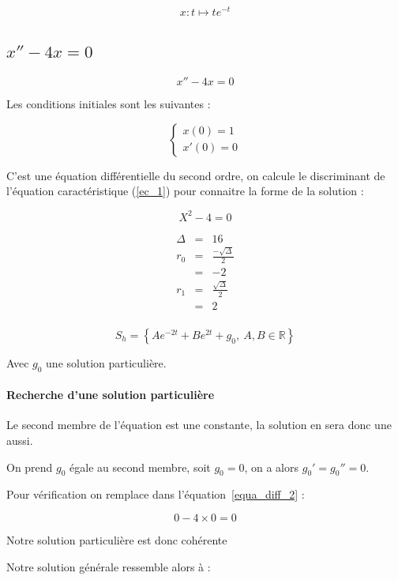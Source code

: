 \documentclass[a4paper, 11pt]{report} %
\newcommand{\R}{\mathbb{R}}
\renewcommand{\mapsto}{\longmapsto}
\begin{document}
\[
x : t \mapsto te^{-t}
\]
\subsection{$x'' - 4x = 0$} %

\begin{equation}
x'' - 4x = 0
\label{equa_diff_2}
\end{equation}

Les conditions initiales sont les suivantes :

\[
\left\{\begin{array}{l}
x(0) = 1\\
x'(0) = 0
\end{array}\right.
\]

C'est une équation différentielle du second ordre, on calcule le discriminant de l'équation caractéristique (\ref{ec_1})
pour connaitre la forme de la solution :

\begin{equation}
X^2 - 4 = 0
\label{ec_1}
\end{equation}

\begin{eqnarray*}
    \Delta & = & 16\\
    r_0 & = & \frac{-\sqrt{\Delta}}{2}\\
    & = & -2\\
    r_1 & = & \frac{\sqrt{\Delta}}{2}\\
    & = & 2\\
\end{eqnarray*}

\[
S_h = \left\{Ae^{-2t} + Be^{2t} + g_0,~A,B\in\R\right\}
\]

Avec $g_0$ une solution particulière.

\paragraph{Recherche d'une solution particulière}

Le second membre de l'équation est une constante, la solution en sera donc une aussi.

On prend $g_0$ égale au second membre, soit $g_0 = 0$, on a alors $g_0' = g_0'' = 0$.

Pour vérification on remplace dans l'équation~\ref{equa_diff_2} :

\[
0 - 4\times0 = 0
\]

Notre solution particulière est donc cohérente

Notre solution générale ressemble alors à :
\end{document}
